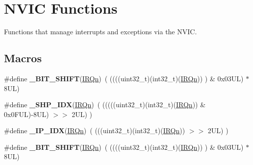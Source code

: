 \hypertarget{group__CMSIS__Core__NVICFunctions}{}\section{N\+V\+IC Functions}
\label{group__CMSIS__Core__NVICFunctions}


Functions that manage interrupts and exceptions via the N\+V\+IC.  


\subsection*{Macros}
\begin{DoxyCompactItemize}
\item 
\#define {\bfseries \+\_\+\+B\+I\+T\+\_\+\+S\+H\+I\+FT}(\hyperlink{group__Interrupt__vector__numbers_ga666eb0caeb12ec0e281415592ae89083}{I\+R\+Qn})~(  ((((uint32\+\_\+t)(int32\+\_\+t)(\hyperlink{group__Interrupt__vector__numbers_ga666eb0caeb12ec0e281415592ae89083}{I\+R\+Qn}))         )      \&  0x03\+U\+L) $\ast$ 8\+U\+L)\hypertarget{group__CMSIS__Core__NVICFunctions_ga53c75b28823441c6153269f0ecbed878}{}\label{group__CMSIS__Core__NVICFunctions_ga53c75b28823441c6153269f0ecbed878}

\item 
\#define {\bfseries \+\_\+\+S\+H\+P\+\_\+\+I\+DX}(\hyperlink{group__Interrupt__vector__numbers_ga666eb0caeb12ec0e281415592ae89083}{I\+R\+Qn})~( (((((uint32\+\_\+t)(int32\+\_\+t)(\hyperlink{group__Interrupt__vector__numbers_ga666eb0caeb12ec0e281415592ae89083}{I\+R\+Qn})) \& 0x0\+F\+U\+L)-\/8\+U\+L) $>$$>$    2\+U\+L)      )\hypertarget{group__CMSIS__Core__NVICFunctions_gaee4f7eb5d7e770ad51489dbceabb1755}{}\label{group__CMSIS__Core__NVICFunctions_gaee4f7eb5d7e770ad51489dbceabb1755}

\item 
\#define {\bfseries \+\_\+\+I\+P\+\_\+\+I\+DX}(\hyperlink{group__Interrupt__vector__numbers_ga666eb0caeb12ec0e281415592ae89083}{I\+R\+Qn})~(   (((uint32\+\_\+t)(int32\+\_\+t)(\hyperlink{group__Interrupt__vector__numbers_ga666eb0caeb12ec0e281415592ae89083}{I\+R\+Qn}))                $>$$>$    2\+U\+L)      )\hypertarget{group__CMSIS__Core__NVICFunctions_ga370ec4b1751a6a889d849747df3763a9}{}\label{group__CMSIS__Core__NVICFunctions_ga370ec4b1751a6a889d849747df3763a9}

\item 
\#define {\bfseries \+\_\+\+B\+I\+T\+\_\+\+S\+H\+I\+FT}(\hyperlink{group__Interrupt__vector__numbers_ga666eb0caeb12ec0e281415592ae89083}{I\+R\+Qn})~(  ((((uint32\+\_\+t)(int32\+\_\+t)(\hyperlink{group__Interrupt__vector__numbers_ga666eb0caeb12ec0e281415592ae89083}{I\+R\+Qn}))         )      \&  0x03\+U\+L) $\ast$ 8\+U\+L)\hypertarget{group__CMSIS__Core__NVICFunctions_ga53c75b28823441c6153269f0ecbed878}{}\label{group__CMSIS__Core__NVICFunctions_ga53c75b28823441c6153269f0ecbed878}


\end{DoxyCompactItemize}
